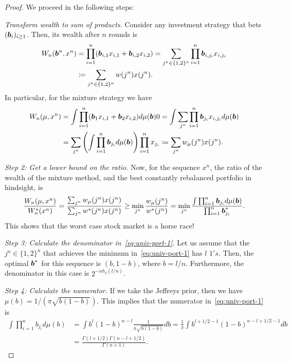     \begin{proof} We proceed in the following steps: 

    \emph{Transform wealth to sum of products.} Consider any investment strategy that bets $(\boldsymbol{b}_i)_{i \geq 1}$. Then, its wealth after $n$ rounds is 
    \begin{align}
        W_n(\boldsymbol{b}^n, x^n) &= \prod_{i=1}^n (\boldsymbol{b}_{i,1} x_{i,1} + \boldsymbol{b}_{i,2} x_{i,2} )  = \sum_{j^n \in \{1, 2\}^n } \prod_{i=1}^n \boldsymbol{b}_{i, j_i} x_{i, j_i}  \\
        & \coloneqq \sum_{j^n \in \{1, 2\}^n} w(j^n) x(j^n). 
    \end{align}
    In particular, for the mixture strategy we have  
    \begin{align}
        W_n(\mu, x^n) &= \int \prod_{i=1}^n (\boldsymbol{b}_1 x_{i,1} + \boldsymbol{b}_2 x_{i,2}) d\mu(\boldsymbol{b})0  
        = \int \sum_{j^n} \prod_{i=1}^n \boldsymbol{b}_{j_i} x_{i,j_i} d\mu(\boldsymbol{b})  \\
        & = \sum_{j^n} \left(  \int \prod_{i=1}^n \boldsymbol{b}_{j_i} d\mu(\boldsymbol{b}) \right)  \prod_{i=1}^n x_{j_i} \coloneqq \sum_{j^n } w_\mu(j^n) x(j^n). 
    \end{align}

        \emph{Step 2: Get a lower bound on the ratio.} Now, for the sequence $x^n$, the ratio of the wealth of the mixture method, and the best constantly rebalanced portfolio in hindsight, is 
        \begin{align}
            \frac{W_n(\mu, x^n)}{W_n^*(x^n)} = \frac{\sum_{j^n} w_\mu(j^n) x(j^n) }{\sum_{j^n} w^*(j^n) x(j^n)} \geq \min_{j^n} \frac{w_\mu(j^n)}{w^*(j^n)} = \min_{j^n} \frac{\int \prod_{i=1}^n \boldsymbol{b}_{j_i} d\mu(\boldsymbol{b})}{\prod_{i=1}^n \boldsymbol{b}^*_{j_i} }.  \label{eq:univ-port-1}
        \end{align}
        This shows that the worst case stock market is a horse race! 

        \emph{Step 3: Calculate the denominator in~\eqref{eq:univ-port-1}.} Let us assume that the $j^n \in \{1, 2\}^n$ that achieves the minimum in~\eqref{eq:univ-port-1} has $l$ $1's$. Then, the optimal $\boldsymbol{b}^*$ for this sequence is $(b, 1-b)$, where $b = l/n$. Furthermore, the denominator in this case is $2^{-n h_2(l/n)}$. 

        \emph{Step 4: Calculate the numerator.} If we take the Jeffreys prior, then we have $\mu(b) = 1/(\pi \sqrt{b (1-b)})$. This implies that the numerator in~\eqref{eq:univ-port-1} is 
        \begin{align}
            \int \prod_{i=1}^n b_{j_i} d\mu(b) &= \int b^{l} (1-b)^{n-l} \frac{1}{\pi \sqrt{b(1-b)}} db = \frac{1}{\pi} \int b^{l+1/2 - 1} (1-b)^{n-l+1/2 - 1} db  \\
            & = \frac{\Gamma(l+1/2) \Gamma(n-l+1/2)}{\Gamma(n+1)}.  \label{eq:univ-port-2}
        \end{align}


\end{proof}
